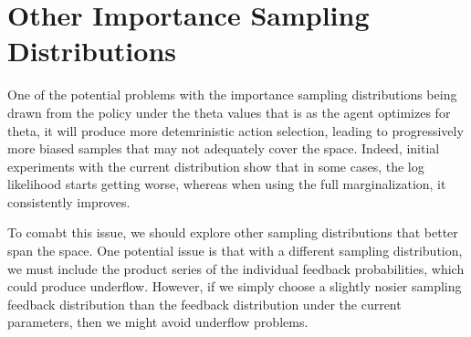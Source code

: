 \documentclass{article}
\begin{document}
\section{Other Importance Sampling Distributions}
One of the potential problems with the importance sampling distributions being drawn from the policy under the theta values that is as the agent optimizes for theta, it will produce more detemrinistic action selection, leading to progressively more biased samples that may not adequately cover the space. Indeed, initial experiments with the current distribution show that in some cases, the log likelihood starts getting worse, whereas when using the full marginalization, it consistently improves.

To comabt this issue, we should explore other sampling distributions that better span the space. One potential issue is that with a different sampling distribution, we must include the product series of the individual feedback probabilities, which could produce underflow. However, if we simply choose a slightly nosier sampling feedback distribution than the feedback distribution under the current parameters, then we might avoid underflow problems.
\end{document}
